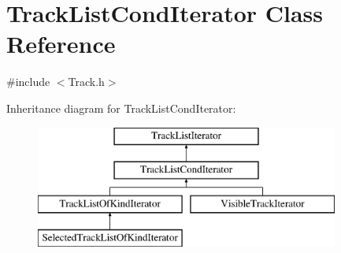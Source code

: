 \hypertarget{class_track_list_cond_iterator}{}\section{Track\+List\+Cond\+Iterator Class Reference}
\label{class_track_list_cond_iterator}


{\ttfamily \#include $<$Track.\+h$>$}

Inheritance diagram for Track\+List\+Cond\+Iterator\+:\begin{figure}[H]
\begin{center}
\leavevmode
\includegraphics[height=4.000000cm]{class_track_list_cond_iterator}
\end{center}
\end{figure}
